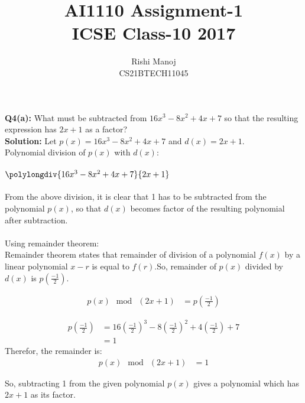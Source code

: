 \documentclass[journal,12pt,twocolumn]{IEEEtran}
\title{AI1110 Assignment-1\\ICSE Class-10 2017}
\author{Rishi Manoj\\CS21BTECH11045}
\begin{document}
\maketitle

\providecommand{\brak}[1]{\ensuremath{\left(#1\right)}}

\textbf{Q4(a):}
What must be subtracted from $16x^3-8x^2+4x+7$ so that the resulting expression has $2x+1$ as a factor?\\
\textbf{Solution:}
Let $p(x)=16x^3-8x^2+4x+7$ and $d(x)=2x+1$.\\
Polynomial division of $p(x)$ with $d(x)$:\\
\\
$\polylongdiv{16x^3-8x^2+4x+7}{2x+1}$
\\
\\
From the above division, it is clear that 1 has to be subtracted from the polynomial $p(x)$, so that $d(x)$ becomes factor of the resulting polynomial after subtraction.
\\
\\
Using remainder theorem:\\
Remainder theorem states that remainder of division of a polynomial $f(x)$ by a linear polynomial $x-r$ is equal to $f(r)$.So, remainder of $p(x)$ divided by $d(x)$ is $p\brak{\frac{-1}{2}}$.

\begin{align}
      p(x) \mod\ (2x+1) &= p\brak{\frac{-1}{2}}
\end{align}

\begin{align}
      p\brak{\frac{-1}{2}} &= 16\brak{\frac{-1}{2}}^3-8\brak{\frac{-1}{2}}^2+4\brak{\frac{-1}{2}}+7
      \\
      &= 1
\end{align}
Therefor, the remainder is:
\begin{align}
      p(x) \mod\ (2x+1) &= 1
\end{align}

So, subtracting 1 from the given polynomial $p(x)$ gives a polynomial which has $2x+1$ as its factor.
\end{document}
